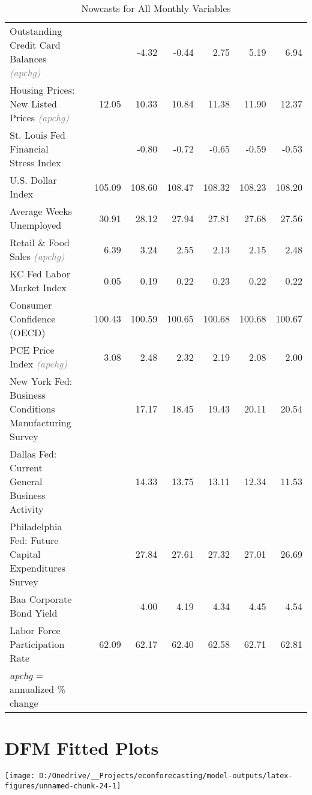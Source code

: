 \documentclass[11pt, letterpaper]{article}\usepackage[]{graphicx}\usepackage[]{color}
\begin{document}
\begin{table}[H]
\begin{tabular}{lrrrrrrr}
  Outstanding Credit Card Balances \textit{\footnotesize\textcolor{gray}{(apchg)}} &  &  & -4.32 & -0.44 & 2.75 & 5.19 & 6.94 \\ 
  Housing Prices: New Listed Prices \textit{\footnotesize\textcolor{gray}{(apchg)}} &  & 12.05 & 10.33 & 10.84 & 11.38 & 11.90 & 12.37 \\ 
  St. Louis Fed Financial Stress Index &  &  & -0.80 & -0.72 & -0.65 & -0.59 & -0.53 \\ 
  U.S. Dollar Index &  & 105.09 & 108.60 & 108.47 & 108.32 & 108.23 & 108.20 \\ 
  Average Weeks Unemployed &  & 30.91 & 28.12 & 27.94 & 27.81 & 27.68 & 27.56 \\ 
  Retail \& Food Sales \textit{\footnotesize\textcolor{gray}{(apchg)}} &  & 6.39 & 3.24 & 2.55 & 2.13 & 2.15 & 2.48 \\ 
  KC Fed Labor Market Index &  & 0.05 & 0.19 & 0.22 & 0.23 & 0.22 & 0.22 \\ 
  Consumer Confidence (OECD) &  & 100.43 & 100.59 & 100.65 & 100.68 & 100.68 & 100.67 \\ 
  PCE Price Index \textit{\footnotesize\textcolor{gray}{(apchg)}} &  & 3.08 & 2.48 & 2.32 & 2.19 & 2.08 & 2.00 \\ 
  New York Fed: Business Conditions Manufacturing Survey &  &  & 17.17 & 18.45 & 19.43 & 20.11 & 20.54 \\ 
  Dallas Fed: Current General Business Activity &  &  & 14.33 & 13.75 & 13.11 & 12.34 & 11.53 \\ 
  Philadelphia Fed: Future Capital Expenditures Survey &  &  & 27.84 & 27.61 & 27.32 & 27.01 & 26.69 \\ 
  Baa Corporate Bond Yield &  &  & 4.00 & 4.19 & 4.34 & 4.45 & 4.54 \\ 
  Labor Force Participation Rate &  & 62.09 & 62.17 & 62.40 & 62.58 & 62.71 & 62.81 \\ 
   \hline 
 \textit{apchg} = annualized \% change 
\end{tabular}
\endgroup
\caption{Nowcasts for All Monthly Variables} 
\end{table}



\appendix
\appendixpage
\addappheadtotoc

\section{DFM Fitted Plots}


{\centering \texttt{[image: D:/Onedrive/\_\_Projects/econforecasting/model-outputs/latex-figures/unnamed-chunk-24-1]} 

}
\end{document}

